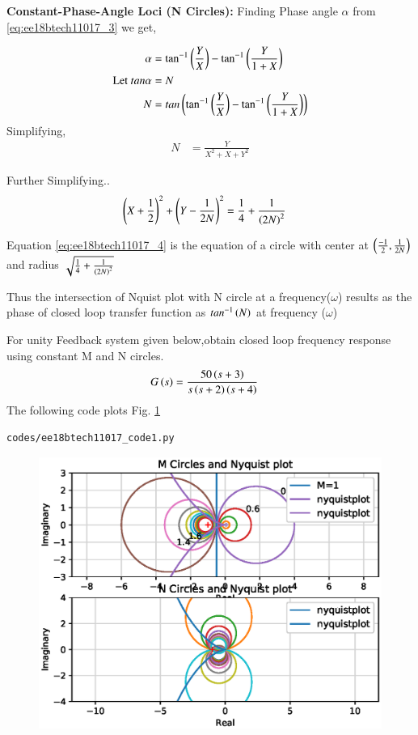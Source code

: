 \textbf{Constant-Phase-Angle Loci (N Circles):}
Finding Phase angle $\alpha$ from \eqref{eq:ee18btech11017_3} we get,

\begin{align}
\alpha &= \tan^{-1}\left(\frac{Y}{X}\right)-\tan^{-1}\left(\frac{Y}{1+X}\right)
\\
\text{Let } tan\alpha &= N
\\
N &= tan\left(\tan^{-1}\left(\frac{Y}{X}\right)-\tan^{-1}\left(\frac{Y}{1+X}\right)\right)
\end{align}
Simplifying,
\begin{align}
N &= \frac{Y}{X^{2}+X+Y^{2}}
\end{align}

Further Simplifying..
\begin{align}
\left(X+\frac{1}{2}\right)^{2}+\left(Y-\frac{1}{2N}\right)^{2} &= \frac{1}{4}+\frac{1}{\left(2N\right)^{2}}
\label{eq:ee18btech11017_4}
\end{align}

Equation \eqref{eq:ee18btech11017_4} is the equation of a circle with center at $\left(\frac{-1}{2},\frac{1}{2N}\right)$ and radius $\sqrt{\frac{1}{4}+\frac{1}{\left(2N\right)^{2}}}$


Thus the intersection of Nquist plot with N circle at a frequency($\omega$) results as the phase of closed loop transfer function as $tan^{-1}\left(N\right)$ at frequency ($\omega$)


For unity Feedback system given below,obtain closed loop frequency response using constant M and N circles.
\begin{align}
G\left(s\right) &=\frac{50\left(s+3\right)}{s\left(s+2\right)\left(s+4\right)}
\end{align}
\solution 
The following code plots Fig. \ref{fig:ee18btech11017_fig1}
\begin{lstlisting}
codes/ee18btech11017_code1.py
\end{lstlisting}


\begin{figure}[!h]
  \includegraphics[width=\columnwidth]{./figs/ee18btech11017_fig1.eps}
 \caption{}
  \label{fig:ee18btech11017_fig1}
\end{figure}

